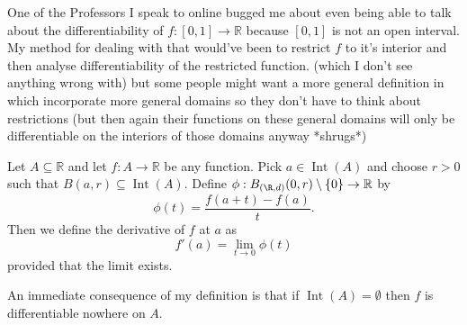 	One of the Professors I speak to online bugged me about even being able to talk  about the differentiability of $f : [0, 1] \to \mathbb{R}$ because $[0, 1]$ is not an open interval. My method for dealing with that would've been to restrict $f$ to it's interior and then analyse differentiability of the restricted function. (which I don't see anything wrong with) but some people might want a more general definition in which incorporate more general domains so they don't have to think about restrictions (but then again their functions on these general domains will only be differentiable on the interiors of those domains anyway *shrugs*)
	
	
	\begin{definition}
		Let $A \subseteq \mathbb{R}$ and let $f : A \to \mathbb{R}$ be any function. Pick $a \in \operatorname{Int}(A)$ and choose $r > 0$ such that $B(a, r) \subseteq \operatorname{Int}(A)$. Define $\phi : B_{(\R, d)}(0, r) \setminus \{0\} \to \mathbb{R}$ by $$\phi(t) = \frac{f(a+t) - f(a)}{t}.$$ Then we define the derivative of $f$ at $a$ as $$f'(a) = \lim_{t \to 0} \phi(t)$$ provided that the limit exists.
	\end{definition}
	
	\begin{point}
	An immediate consequence of my definition is that if $\operatorname{Int}(A) = \emptyset$ then $f$ is differentiable nowhere on $A$.
\end{point}
	
	\todog{}